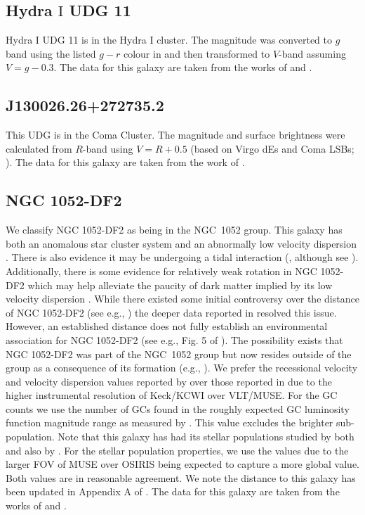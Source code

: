 \subsection{Hydra $\mathrm{I}$ UDG 11}
Hydra $\mathrm{I}$ UDG 11 is in the Hydra $\mathrm{I}$ cluster. The magnitude was converted to $g$ band using the listed $g-r$ colour in \citet{Iodice2020} and then transformed to $V$-band assuming $V = g-0.3$. The data for this galaxy are taken from the works of \citet{Iodice2020} and \citet{Iodice2023}.

\subsection{J130026.26+272735.2}
This UDG is in the Coma Cluster. The magnitude and surface brightness were calculated from $R$-band using $V=R+0.5$ (based on Virgo dEs and Coma LSBs; \citealp{vanZee2004, Alabi2020}). The data for this galaxy are taken from the work of \citet{Chilingarian2019}.

\subsection{NGC 1052-DF2}
We classify NGC 1052-DF2 as being in the NGC~1052 group. This galaxy has both an anomalous star cluster system \citep{vanDokkum2018b, Shen2021} and an abnormally low velocity dispersion \citep{vanDokkum2018, Danieli2019}. There is also evidence it may be undergoing a tidal interaction (\citealp{Keim2021}, although see \citealp{Montes2021, Golini2024}). Additionally, there is some evidence for relatively weak rotation in NGC 1052-DF2 which may help alleviate the paucity of dark matter implied by its low velocity dispersion \citep{Emsellem2019, Lewis2020, Montes2021}. While there existed some initial controversy over the distance of NGC 1052-DF2 (see e.g., \citealp{Trujillo2019, Monelli2019}) the deeper data reported in \citet{Shen2021} resolved this issue. However, an established distance does not fully establish an environmental association for NGC 1052-DF2 (see e.g., Fig. 5 of \citealp{Shen2021}). The possibility exists that NGC 1052-DF2 was part of the NGC~1052 group but now resides outside of the group as a consequence of its formation (e.g., \citealp{vanDokkum2022}). We prefer the recessional velocity and velocity dispersion values reported by \citet{Danieli2019} over those reported in \citet{Emsellem2019} due to the higher instrumental resolution of Keck/KCWI over VLT/MUSE. For the GC counts we use the number of GCs found in the roughly expected GC luminosity function magnitude range as measured by \citet{Shen2021}. This value excludes the brighter sub-population. Note that this galaxy has had its stellar populations studied by both \citet{RuizLara2019} and also by \citet{Fensch2019}. For the stellar population properties, we use the \citet{Fensch2019} values due to the larger FOV of MUSE over OSIRIS being expected to capture a more global value. Both values are in reasonable agreement. We note the distance to this galaxy has been updated in Appendix A of \citet{Shen2023}. The data for this galaxy are taken from the works of \citet{vanDokkum2018, Fensch2019, Danieli2019, Shen2021} and \citet{Shen2023}.


